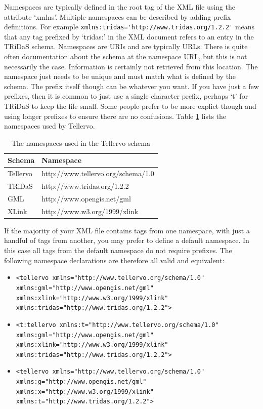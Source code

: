 Namespaces are typically defined in the root tag of the XML file using the attribute `xmlns'.  Multiple namespaces can be described by adding prefix definitions.  For example \lstinline$xmlns:tridas='http://www.tridas.org/1.2.2'$ means that any tag prefixed by `tridas:' in the XML document refers to an entry in the TRiDaS schema.  Namespaces are URIs and are typically URLs.  There is quite often documentation about the schema at the namespace URL, but this is not necessarily the case.  Information is certainly not retrieved from this location.  The namespace just needs to be unique and must match what is defined by the schema.  The prefix itself though can be whatever you want.  If you have just a few prefixes, then it is common to just use a single character prefix, perhaps `t' for TRiDaS to keep the file small.  Some people prefer to be more explict though and using longer prefixes to ensure there are no confusions.  Table \ref{tbl:namespaces} lists the namespaces used by Tellervo.


\begin{table}
\begin{center}
\begin{tabular}{ll}

\toprule
Schema & Namespace \\
\midrule
Tellervo & http://www.tellervo.org/schema/1.0\\
TRiDaS & http://www.tridas.org/1.2.2\\
GML & http://www.opengis.net/gml\\
XLink & http://www.w3.org/1999/xlink\\
\bottomrule
\end{tabular}
\caption{The namespaces used in the Tellervo schema}
\label{tbl:namespaces}
\end{center}
\end{table}


If the majority of your XML file contains tags from one namespace, with just a handful of tags from another, you may prefer to define a default namespace.  In this case all tags from the default namespace do not require prefixes.  The following namespace declarations are therefore all valid and equivalent:

\begin{itemize}
 \item \lstinline$<tellervo xmlns="http://www.tellervo.org/schema/1.0" xmlns:gml="http://www.opengis.net/gml" $ \\ 
  \lstinline$xmlns:xlink="http://www.w3.org/1999/xlink" xmlns:tridas="http://www.tridas.org/1.2.2">$
 \item \lstinline$<t:tellervo xmlns:t="http://www.tellervo.org/schema/1.0" xmlns:gml="http://www.opengis.net/gml" $ \\   \lstinline$xmlns:xlink="http://www.w3.org/1999/xlink" xmlns:tridas="http://www.tridas.org/1.2.2">$
 \item \lstinline$<tellervo xmlns="http://www.tellervo.org/schema/1.0" xmlns:g="http://www.opengis.net/gml" $ \\   \lstinline$xmlns:x="http://www.w3.org/1999/xlink" xmlns:t="http://www.tridas.org/1.2.2">$
\end{itemize}


